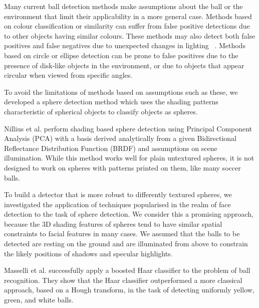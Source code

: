 \documentclass{sig-alternate-05-2015}
\newcommand{\citep}[1]{\cite{#1}}
\newcommand{\citet}[1]{\cite{#1}}
\begin{document}
{		Many current ball detection methods make assumptions about the ball or the environment that limit their applicability in a more general case. Methods based on colour classification or similarity can suffer from false positive detections due to other objects having similar colours. These methods may also detect both false positives and false negatives due to unexpected changes in lighting ~\citep{HendersonEtAl2008}. Methods based on circle or ellipse detection can be prone to false positives due to the presence of disk-like objects in the environment, or due to objects that appear circular when viewed from specific angles.

		To avoid the limitations of methods based on assumptions such as these, we developed a sphere detection method which uses the shading patterns characteristic of spherical objects to classify objects as spheres.

		Nillius et al. \citet{nillius2008shading} perform shading based sphere detection using Principal Component Analysis (PCA) with a basis derived analytically from a given Bidirectional Reflectance Distribution Function (BRDF) and assumptions on scene illumination. While this method works well for plain untextured spheres, it is
		not designed to work on spheres with patterns printed on them, like many soccer balls.







		To build a detector that is more robust to differently textured spheres, we investigated the application of techniques popularised in the realm of face detection to the task of sphere detection. We consider this a promising approach, because the 3D shading features of spheres tend to have similar spatial constraints to facial features in many cases. We assumed that the balls to be detected are resting on the ground and are illuminated from above to constrain the likely positions of shadows and specular highlights.



		Masselli et al. \citet{masselli2013haar} successfully apply a boosted Haar classifier \citep{viola2001robust} to the problem of ball recognition. They show that the Haar classifier outperformed a more classical approach, based on a Hough transform, in the task of detecting uniformly yellow, green, and white balls.

}
\end{document}
